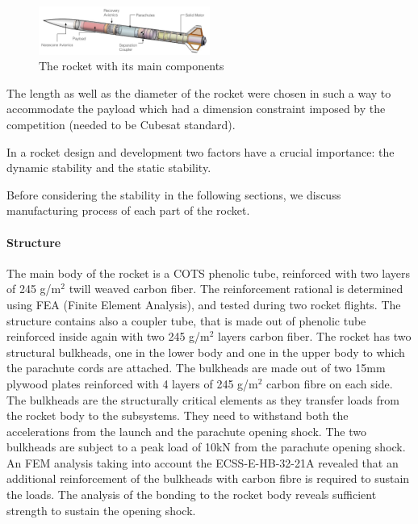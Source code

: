 \begin{figure}[h!]
\centering
\includegraphics[width=0.5\textwidth]{img/rocket_sw_annotated.jpg}
\caption{The rocket with its main components}
\label{f:rocket_adnoted}
\end{figure}

The length as well as the diameter of the rocket were chosen in such a way to accommodate the payload which had a dimension constraint imposed by the competition (needed to be Cubesat standard).

In a rocket design and development two factors have a crucial importance: the dynamic stability and the static stability.

Before considering the stability in the following sections, we discuss manufacturing process of each part of the rocket.



\paragraph{Structure}
\hfill \break
The main body of the rocket is a COTS phenolic tube, reinforced with two layers of 245 g/m$^2$ twill weaved carbon fiber. The reinforcement rational is determined using FEA (Finite Element Analysis), and tested during two rocket flights.
The structure contains also a coupler tube, that is made out of phenolic tube reinforced inside again with two 245 g/m$^2$ layers carbon fiber.
The rocket has two structural bulkheads, one in the lower body and one in the upper body to which the parachute cords are attached. The bulkheads are made out of two 15mm plywood plates reinforced with 4 layers of 245 g/m$^2$ carbon fibre on each side.  The bulkheads are the structurally critical elements as they transfer loads from the rocket body to the subsystems. They need to withstand both the accelerations from the launch and the parachute opening shock. 
The two bulkheads are subject to a peak load of 10kN from the parachute opening shock. An FEM analysis taking into account the  ECSS-E-HB-32-21A revealed that an additional reinforcement of the bulkheads with carbon fibre is required to sustain the loads. The analysis of the bonding to the rocket body reveals sufficient strength to sustain the opening shock.


